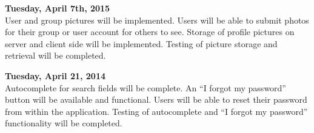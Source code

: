 \documentclass[11pt]{article}
\begin{document}
\textbf{Tuesday, April 7th, 2015}
\\
User and group pictures will be implemented. Users will be able to submit 
photos for their group or user account for others to see. Storage of profile pictures on 
server and client side will be implemented. Testing of picture storage and 
retrieval will be completed.
 
\textbf{Tuesday, April 21, 2014}
\\	
Autocomplete for search fields will be complete. An ``I forgot my password'' button will 
be available and functional. Users will be able to reset their password from 
within the application. Testing of autocomplete and ``I forgot my password'' 
functionality will be completed.


\newpage

\nocite{}
\end{document}

